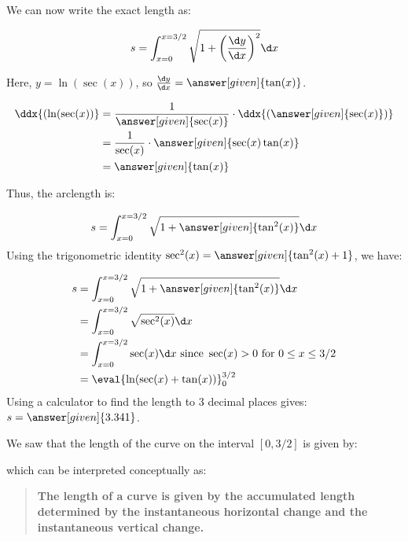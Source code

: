 \documentclass{ximera}
\begin{document}
We can now write the exact length as:

\[
s = \int_{x=0}^{x=3/2} \sqrt{1+\left( \frac{\d y}{\d x} \right)^2} \d x
\]
 
 Here, $y= \ln( \sec(x) )$, so $ \frac{\d y}{\d x} = \answer[given]{\tan(x)}$.
 
 \begin{hint}
 \begin{align*}
 \ddx{( \ln( \sec(x) )} &= \frac{1}{\answer[given]{ \sec(x) }} \cdot \ddx{\left(\answer[given]{ \sec(x)}\right)}\\ 
 &= \frac{1}{ \sec(x) } \cdot \answer[given]{ \sec(x)\tan(x)}\\ 
 &= \answer[given]{\tan(x)}
 \end{align*}
 \end{hint}
 
 Thus, the arclength is:
 
 \[
s = \int_{x=0}^{x=3/2} \sqrt{1+\answer[given]{\tan^2(x)}} \d x
\]
Using the trigonometric identity $\sec^2(x) = \answer[given]{\tan^2(x)+1}$, we have:

\begin{align*}
s &= \int_{x=0}^{x=3/2} \sqrt{1+\answer[given]{\tan^2(x)}} \d x\\
&= \int_{x=0}^{x=3/2} \sqrt{\sec^2(x)} \d x \\
& = \int_{x=0}^{x=3/2} \sec(x) \d x \textrm{ since } \sec(x) > 0 \textrm{ for } 0\leq x\leq 3/2 \\
&= \eval{\ln(\sec(x) + \tan(x))}_0^{3/2}  
\end{align*}
Using a calculator to find the length to 3 decimal places gives: $s = \answer[given]{3.341}$.

\begin{remark}
We saw that the length of the curve on the interval $[0,3/2]$ is given by:
\begin{image}
\end{image}
which can be interpreted conceptually as:
\begin{quote}
  \textbf{The length of a curve is given by the
    \textcolor{green!70!black!70!blue}{accumulated}
    \textcolor{purple!50!blue!90!black}{length determined by the
      instantaneous horizontal change and the instantaneous vertical
      change}.}
\end{quote}
\end{remark}
\end{document}
